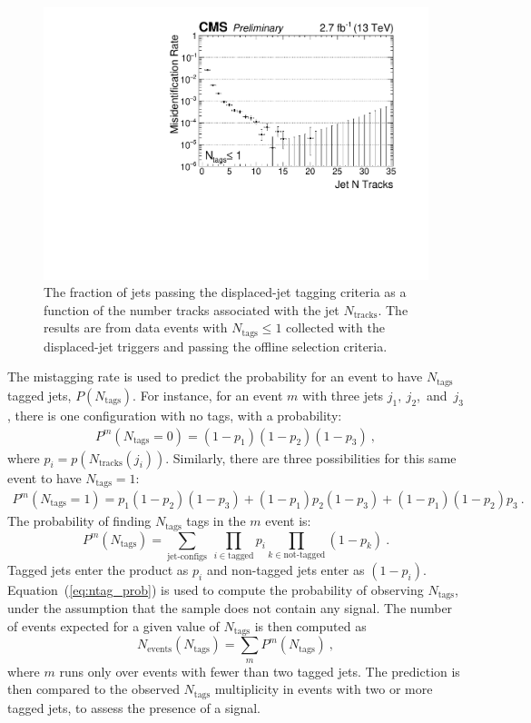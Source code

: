 \begin{figure}
\begin{center}
\includegraphics[width=.6\textwidth]{figures/pas//ANALYSIS/76x_pu/DJET_fakeRate.pdf}
\caption{The fraction of jets passing the displaced-jet tagging criteria as a function of the number tracks associated with the jet $N_{\textrm{tracks}}$. 
The results are from data events with $N_{\textrm{tags}} \leq 1$ collected with the displaced-jet triggers and passing the offline selection criteria. \label{fig:fake_rate}}
\end{center}
\end{figure}

The mistagging rate is used to predict the probability for an event to
have $N_\text{tags}$ tagged jets, $P(N_{\textrm{tags}})$. For instance, for an event $m$
with three jets $j_1, ~j_2$,~and~$ j_3$, there is one configuration with no tags,
with a probability:
\begin{align*} 
P^m(N_{\textrm{tags}}=0) = (1-p_1)(1-p_2)(1-p_3)~,
\end{align*} 
where $p_i = p(N_{\textrm{tracks}}(j_i))$.  Similarly, there are three
possibilities for this same event to have $N_{\textrm{tags}}=1$:
\begin{align*}
P^m(N_{\textrm{tags}}=1) = p_1(1-p_2)(1-p_3)
+  (1-p_1)p_2(1-p_3)
+  (1-p_1)(1-p_2)p_3~.
\end{align*}
The probability of finding $N_{\textrm{tags}}$  tags in the $m$ event is:
\begin{equation}
P^m(N_{\textrm{tags}}) = \sum_{\textrm{jet-configs}}~\prod_{i\in
  \textrm{tagged}} p_i \prod_{k \in \textrm{not-tagged}} (1-p_k)~.
\label{eq:ntag_prob}
\end{equation}
Tagged jets enter the product as $p_i$ and non-tagged jets enter as
$(1-p_i)$. Equation~(\ref{eq:ntag_prob}) is used to compute the
probability of observing $N_{\textrm{tags}}$, under the assumption
that the sample does not contain any signal. The number of events
expected for a given value of $N_{\textrm{tags}}$ is then computed as
\begin{equation}
N_{\textrm{events}}(N_{\textrm{tags}}) = \sum_{m} P^m(N_{\textrm{tags}})~,
\end{equation}
where $m$ runs only over events with fewer than two tagged jets.  The prediction is then compared
to the observed $N_{\textrm{tags}}$ multiplicity in events with two or
more tagged jets, to assess the presence of a signal. 

